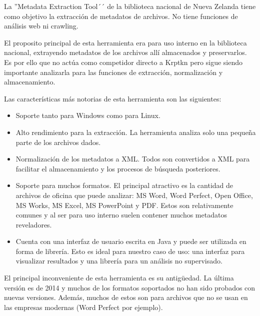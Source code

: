 La ''Metadata Extraction Tool´´ de la biblioteca nacional de Nueva Zelanda tiene como objetivo la extracción de metadatos de archivos. No tiene funciones de análisis web ni crawling.

El proposito principal de esta herramienta era para uso interno en la biblioteca nacional, extrayendo metadatos de los archivos allí almacenados y preservarlos. Es por ello que no actúa como competidor directo a Krptkn pero sigue siendo importante analizarla para las funciones de extracción, normalización y almacenamiento.

Las características más notorias de esta herramienta son las siguientes:
\begin{itemize}
  \item Soporte tanto para Windows como para Linux.
  \item Alto rendimiento para la extracción. La herramienta analiza solo una pequeña parte de los archivos dados.
  \item Normalización de los metadatos a XML. Todos son convertidos a XML para facilitar el almacenamiento y los procesos de búsqueda posteriores.
  \item Soporte para muchos formatos. El principal atractivo es la cantidad de archivos de oficina que puede analizar: MS Word, Word Perfect, Open Office, MS Works, MS Excel, MS PowerPoint y PDF. Estos son relativamente comunes y al ser para uso interno suelen contener muchos metadatos reveladores.
  \item Cuenta con una interfaz de usuario escrita en Java y puede ser utilizada en forma de librería. Esto es ideal para nuestro caso de uso: una interfaz para visualizar resultados y una librería para un análisis no supervisado. 
\end{itemize}

El principal inconveniente de esta herramienta es su antigüedad. La última versión es de 2014 y muchos de los formatos soportados no han sido probados con nuevas versiones. Además, muchos de estos son para archivos que no se usan en las empresas modernas (Word Perfect por ejemplo).